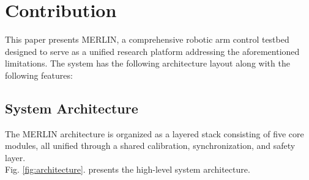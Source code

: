 \documentclass[a4paper, 10pt, conference]{ieeeconf}      %
\begin{document}



\section{Contribution}
This paper presents MERLIN, a comprehensive robotic arm control testbed designed to serve as a unified research platform addressing the aforementioned limitations. The system has the following architecture layout along with the following features:

\vspace{-0.3cm}
\subsection{System Architecture}
\vspace{-0.215cm}
The MERLIN architecture is organized as a layered stack consisting of five core modules, all unified through a shared calibration, synchronization, and safety layer. \\Fig. \ref{fig:architecture}. presents the high-level system architecture.




\end{document}
